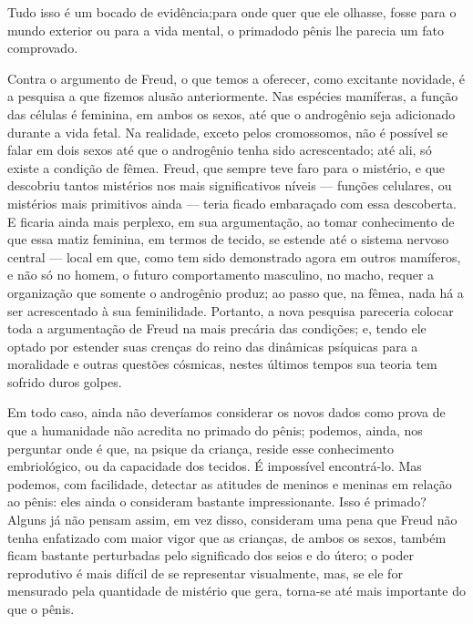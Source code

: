  Tudo isso é um bocado de evidência;\idxmascsu[|)] para onde quer que ele olhasse,
fosse para o mundo exterior ou para a vida mental, o primado\idxfreudsuper[|)] do pênis
lhe parecia um fato comprovado.

 Contra o argumento de Freud, o que temos a oferecer, como excitante
novidade, é a pesquisa a que fizemos alusão anteriormente. Nas espécies
mamíferas, a função das células é feminina, em ambos os sexos, até que
o androgênio seja adicionado durante a vida fetal. Na realidade, exceto
pelos cromossomos, não é possível se falar em dois sexos até que o
androgênio tenha sido acrescentado; até ali, só existe a condição de
fêmea.\idxcondfsupr{} Freud, que sempre teve faro para o mistério, e que descobriu
tantos mistérios nos mais significativos níveis --- funções celulares,
ou mistérios mais primitivos ainda --- teria ficado embaraçado com essa
descoberta. E ficaria ainda mais perplexo, em sua argumentação, ao
tomar conhecimento de que essa matiz feminina, em termos de tecido, se
estende até o sistema nervoso central --- local em que, como tem sido
demonstrado agora em outros mamíferos, e não só no homem, o futuro
comportamento masculino, no macho, requer a organização que somente o
androgênio produz; ao passo que, na fêmea, nada há a ser acrescentado à
sua feminilidade. Portanto, a nova pesquisa pareceria colocar toda a
argumentação de Freud na mais precária das condições; e, tendo ele
optado por estender suas crenças do reino das dinâmicas psíquicas para
a moralidade e outras questões cósmicas, nestes últimos tempos sua
teoria tem sofrido duros golpes.

 Em todo caso, ainda não deveríamos considerar os novos dados como
prova de que a humanidade não acredita no primado do pênis; podemos,
ainda, nos perguntar onde é que, na psique da criança, reside esse
conhecimento embriológico, ou da capacidade dos tecidos. É impossível
encontrá-lo. Mas podemos, com facilidade, detectar as atitudes de
meninos e meninas em relação ao pênis: eles ainda o consideram bastante
impressionante. Isso é primado? Alguns já não pensam assim, em vez disso,
consideram uma pena que Freud não tenha enfatizado com
maior vigor que as crianças, de ambos os sexos, também ficam bastante
perturbadas pelo significado dos seios e do útero; o poder reprodutivo\idxcondfcapa{} é
mais difícil de se representar visualmente, mas, se ele for mensurado pela
quantidade de mistério que gera, torna-se até mais importante do que o
pênis.

